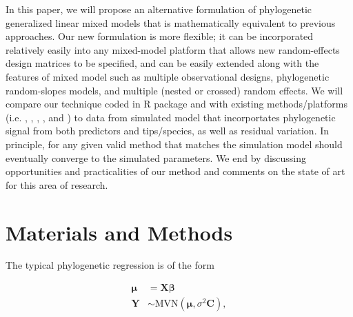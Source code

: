 In this paper, we will propose an alternative formulation of phylogenetic generalized linear mixed models that is mathematically equivalent to previous approaches.
Our new formulation is more flexible; it can be incorporated relatively easily into any mixed-model platform that allows new random-effects design matrices to be specified, and can be easily extended along with the features of mixed model such as multiple observational designs, phylogenetic random-slopes models, and multiple (nested or crossed) random effects.
We will compare our technique coded in R package  and  with existing methods/platforms (i.e.  \citep{pinheiro2014r},  \citep{ho2014phylolm},  \citep{pearse2015pez},  \cite{hadfield2010mcmc}, and  \citep{burkner2016brms}) to data from simulated model that incorportates phylogenetic signal from both predictors and tips/species, as well as residual variation.
In principle, for any given valid method that matches the simulation model should eventually converge to the simulated parameters. 
We end by discussing opportunities and practicalities of our method and comments on the state of art for this area of research. 

\section{Materials and Methods}

\newcommand{\bX}{{\mathbf X}}
\newcommand{\bbeta}{{\boldsymbol \beta}}
\newcommand{\bmu}{{\boldsymbol \mu}}
\newcommand{\bY}{{\mathbf Y}}
\newcommand{\bC}{{\mathbf C}}
\newcommand{\bZ}{{\mathbf Z}}
\newcommand{\bb}{{\mathbf b}}
\newcommand{\bSigma}{{\boldsymbol \Sigma}}

The typical phylogenetic regression is of the form 


\begin{align}
\bmu & = \bX \bbeta  \label{eq:gls1} \\ 
\bY & \sim \textrm{MVN}(\bmu,\sigma^{2} \bC), \label{eq:gls2}
\end{align}

